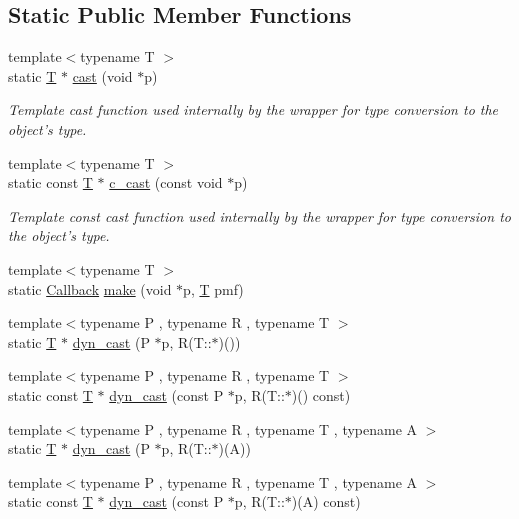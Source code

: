 \subsection*{Static Public Member Functions}
\begin{DoxyCompactItemize}
\item 
{\footnotesize template$<$typename T $>$ }\\static \hyperlink{class_t}{T} $\ast$ \hyperlink{class_d_d4hep_1_1_callback_a069516d5f7974c49d2cef9f8f5d3a3a8}{cast} (void $\ast$p)
\begin{DoxyCompactList}\small\item\em Template cast function used internally by the wrapper for type conversion to the object's type. \item\end{DoxyCompactList}\item 
{\footnotesize template$<$typename T $>$ }\\static const \hyperlink{class_t}{T} $\ast$ \hyperlink{class_d_d4hep_1_1_callback_a6fdb65785fe0baceaa35ba72697ec20f}{c\_\-cast} (const void $\ast$p)
\begin{DoxyCompactList}\small\item\em Template const cast function used internally by the wrapper for type conversion to the object's type. \item\end{DoxyCompactList}\item 
{\footnotesize template$<$typename T $>$ }\\static \hyperlink{class_d_d4hep_1_1_callback}{Callback} \hyperlink{class_d_d4hep_1_1_callback_a548711851bb34b150960188fe4702646}{make} (void $\ast$p, \hyperlink{class_t}{T} pmf)
\item 
{\footnotesize template$<$typename P , typename R , typename T $>$ }\\static \hyperlink{class_t}{T} $\ast$ \hyperlink{class_d_d4hep_1_1_callback_a61b19a8cda5da3a772b6dde5eaae4b85}{dyn\_\-cast} (P $\ast$p, R(T::$\ast$)())
\item 
{\footnotesize template$<$typename P , typename R , typename T $>$ }\\static const \hyperlink{class_t}{T} $\ast$ \hyperlink{class_d_d4hep_1_1_callback_a4497e9974d33b6c7263108bcf81b7b27}{dyn\_\-cast} (const P $\ast$p, R(T::$\ast$)() const)
\item 
{\footnotesize template$<$typename P , typename R , typename T , typename A $>$ }\\static \hyperlink{class_t}{T} $\ast$ \hyperlink{class_d_d4hep_1_1_callback_aae546798486b2d6a31d0cfc8aee92b9c}{dyn\_\-cast} (P $\ast$p, R(T::$\ast$)(A))
\item 
{\footnotesize template$<$typename P , typename R , typename T , typename A $>$ }\\static const \hyperlink{class_t}{T} $\ast$ \hyperlink{class_d_d4hep_1_1_callback_a21c30142836304bb1442482199485133}{dyn\_\-cast} (const P $\ast$p, R(T::$\ast$)(A) const)
\end{DoxyCompactItemize}
